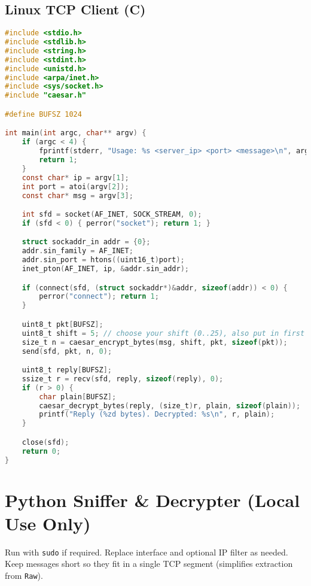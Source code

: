\documentclass[11pt]{article}
\begin{document}
\subsection*{Linux TCP Client (C)}
\begin{lstlisting}[language=C, caption={client.c (Linux)}]
#include <stdio.h>
#include <stdlib.h>
#include <string.h>
#include <stdint.h>
#include <unistd.h>
#include <arpa/inet.h>
#include <sys/socket.h>
#include "caesar.h"

#define BUFSZ 1024

int main(int argc, char** argv) {
    if (argc < 4) {
        fprintf(stderr, "Usage: %s <server_ip> <port> <message>\n", argv[0]);
        return 1;
    }
    const char* ip = argv[1];
    int port = atoi(argv[2]);
    const char* msg = argv[3];

    int sfd = socket(AF_INET, SOCK_STREAM, 0);
    if (sfd < 0) { perror("socket"); return 1; }

    struct sockaddr_in addr = {0};
    addr.sin_family = AF_INET;
    addr.sin_port = htons((uint16_t)port);
    inet_pton(AF_INET, ip, &addr.sin_addr);

    if (connect(sfd, (struct sockaddr*)&addr, sizeof(addr)) < 0) {
        perror("connect"); return 1;
    }

    uint8_t pkt[BUFSZ];
    uint8_t shift = 5; // choose your shift (0..25), also put in first byte
    size_t n = caesar_encrypt_bytes(msg, shift, pkt, sizeof(pkt));
    send(sfd, pkt, n, 0);

    uint8_t reply[BUFSZ];
    ssize_t r = recv(sfd, reply, sizeof(reply), 0);
    if (r > 0) {
        char plain[BUFSZ];
        caesar_decrypt_bytes(reply, (size_t)r, plain, sizeof(plain));
        printf("Reply (%zd bytes). Decrypted: %s\n", r, plain);
    }

    close(sfd);
    return 0;
}
\end{lstlisting}

\section*{Python Sniffer \& Decrypter (Local Use Only)}
Run with \texttt{sudo} if required. Replace interface and optional IP filter as needed. Keep messages short so they fit in a single TCP segment (simplifies extraction from \texttt{Raw}).
\end{document}
